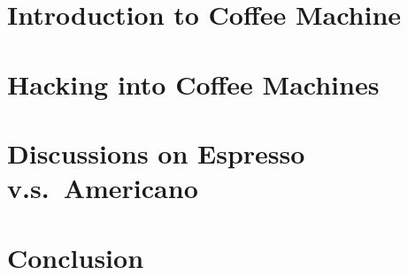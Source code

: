 \documentclass[11pt,letterpaper]{article}
\begin{document}
\maketitle
\thispagestyle{first}

\section{Introduction to Coffee Machine} %

\section{Hacking into Coffee Machines}

\section{Discussions on Espresso v.s.~Americano}

\section{Conclusion}
\end{document}
